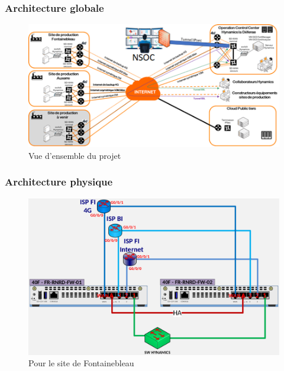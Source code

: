 \documentclass[french, a4paper]{beamer}
\begin{document}
\begin{frame}
    \frametitle{Architecture globale}
    \begin{figure}[h!]
        \centering
        \includegraphics[width = 0.95\linewidth]{img/doc-hy/global-arch.png}
        \caption{Vue d'ensemble du projet}%
        \label{fig:doc-hy/global-arch}
    \end{figure}
\end{frame}

\begin{frame}
    \frametitle{Architecture physique}
    \begin{figure}[h!]
        \centering
        \includegraphics[width = 0.9\linewidth]{img/doc-hy/site-phys-arch.png}
        \caption{Pour le site de Fontainebleau}%
        \label{fig:doc-hy/site-phys-arch}
    \end{figure}
\end{frame}
\end{document}
